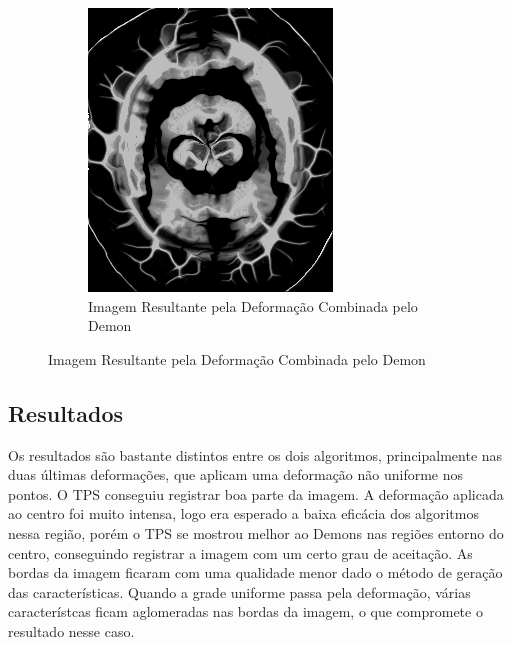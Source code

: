 \documentclass[]{spie}  %
\begin{document}
\begin{figure}[h]
\begin{subfigure}[t]{0.16\textwidth}
	  \includegraphics[width=\textwidth]{../images/resultSinDistDemon.png}
	  \caption{Imagem Resultante pela Deformação Combinada pelo Demon}
	  \label{fig:sindist-image-demon}
	\end{subfigure}
\end{figure}
	
\subsection{Resultados}
	Os resultados são bastante distintos entre os dois algoritmos, principalmente nas duas últimas deformações, que
aplicam uma deformação não uniforme nos pontos. O TPS conseguiu registrar boa parte da imagem. A deformação aplicada ao
centro foi muito intensa, logo era esperado a baixa eficácia dos algoritmos nessa região, porém o TPS se mostrou melhor
ao Demons nas regiões entorno do centro, conseguindo registrar a imagem com um certo grau de aceitação. As bordas da 
imagem ficaram com uma qualidade menor dado o método de geração das características. Quando a grade uniforme passa pela 
deformação, várias característcas ficam aglomeradas nas bordas da imagem, o que compromete o resultado nesse caso.
\end{document}
